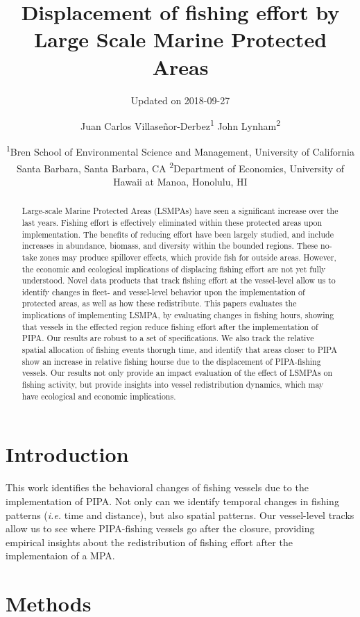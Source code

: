 \documentclass[]{article}
\title{Displacement of fishing effort by Large Scale Marine Protected Areas}
\subtitle{Updated on 2018-09-27}
\author{Juan Carlos Villaseñor-Derbez\textsuperscript{1} John
Lynham\textsuperscript{2}}
\date{\textsuperscript{1}Bren School of Environmental Science and Management,
University of California Santa Barbara, Santa Barbara, CA
\textsuperscript{2}Department of Economics, University of Hawaii at
Manoa, Honolulu, HI}
\begin{document}
\maketitle
\begin{abstract}
Large-scale Marine Protected Areas (LSMPAs) have seen a significant
increase over the last years. Fishing effort is effectively eliminated
within these protected areas upon implementation. The benefits of
reducing effort have been largely studied, and include increases in
abundance, biomass, and diversity within the bounded regions. These
no-take zones may produce spillover effects, which provide fish for
outside areas. However, the economic and ecological implications of
displacing fishing effort are not yet fully understood. Novel data
products that track fishing effort at the vessel-level allow us to
identify changes in fleet- and vessel-level behavior upon the
implementation of protected areas, as well as how these redistribute.
This papers evaluates the implications of implementing LSMPA, by
evaluating changes in fishing hours, showing that vessels in the
effected region reduce fishing effort after the implementation of PIPA.
Our results are robust to a set of specifications. We also track the
relative spatial allocation of fishing events thorugh time, and identify
that areas closer to PIPA show an increase in relative fishing hourse
due to the displacement of PIPA-fishing vessels. Our results not only
provide an impact evaluation of the effect of LSMPAs on fishing
activity, but provide insights into vessel redistribution dynamics,
which may have ecological and economic implications.
\end{abstract}

{
\setcounter{tocdepth}{4}
\tableofcontents
}
\clearpage

\section{Introduction}\label{introduction}

This work identifies the behavioral changes of fishing vessels due to
the implementation of PIPA. Not only can we identify temporal changes in
fishing patterns (\emph{i.e.} time and distance), but also spatial
patterns. Our vessel-level tracks allow us to see where PIPA-fishing
vessels go after the closure, providing empirical insights about the
redistribution of fishing effort after the implementaion of a MPA.

\section{Methods}\label{methods}
\end{document}
